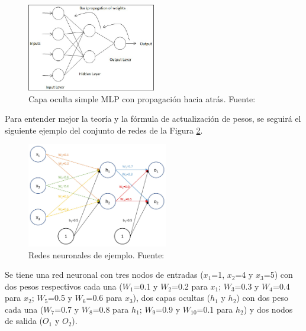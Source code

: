 \begin{itemize}
\begin{itemize}
\begin{itemize}
			\begin{figure}[h]
				\begin{center}
					\includegraphics[width=0.5\textwidth]{2/figures/backpropagation.jpg}
					\caption{Capa oculta simple MLP con propagación hacia atrás. Fuente: \cite{gl_iartificial2019descentgrad}}
					\label{2:fig15}
				\end{center}
			\end{figure}
			
			Para entender mejor la teoría y la fórmula de actualización de pesos, se seguirá el siguiente ejemplo del conjunto de redes de la Figura \ref{2:fig16}.
			
			\clearpage
			\begin{figure}[h]
				\begin{center}
					\includegraphics[width=0.55\textwidth]{2/figures/rna_pesos.jpg}
					\caption{Redes neuronales de ejemplo. Fuente: \cite{gl_ansrw2019backpropagation}}
					\label{2:fig16}
				\end{center}
			\end{figure}
			
			Se tiene una red neuronal con tres nodos de entradas ($x_1$=1, $x_2$=4 y $x_3$=5) con dos pesos respectivos cada una ($W_1$=0.1 y $W_2$=0.2 para $x_1$; $W_3$=0.3 y $W_4$=0.4 para $x_2$; $W_5$=0.5 y $W_6$=0.6 para $x_3$), dos capas ocultas ($h_1$ y $h_2$) con dos peso cada una ($W_7$=0.7 y $W_8$=0.8 para $h_1$; $W_9$=0.9 y $W_10$=0.1 para $h_2$) y dos nodos de salida ($O_1$ y $O_2$).
			

\end{itemize}
\end{itemize}
\end{itemize}
